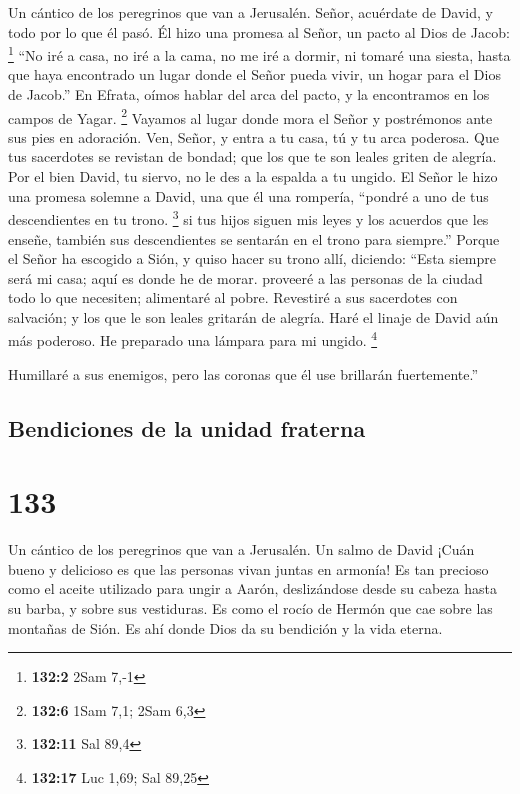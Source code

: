 Un cántico de los peregrinos que van a Jerusalén.  Señor,
acuérdate de David, y todo por lo que él pasó.  Él hizo una
promesa al Señor, un pacto al Dios de Jacob: \footnote{\textbf{132:2}
  2Sam 7,-1}  ``No iré a casa, no iré a la cama,
 no me iré a dormir, ni tomaré una siesta, 
hasta que haya encontrado un lugar donde el Señor pueda vivir, un hogar
para el Dios de Jacob.''  En Efrata, oímos hablar del arca
del pacto, y la encontramos en los campos de Yagar. \footnote{\textbf{132:6}
  1Sam 7,1; 2Sam 6,3}  Vayamos al lugar donde mora el Señor
y postrémonos ante sus pies en adoración.  Ven, Señor, y
entra a tu casa, tú y tu arca poderosa.  Que tus sacerdotes
se revistan de bondad; que los que te son leales griten de alegría.
 Por el bien David, tu siervo, no le des a la espalda a tu
ungido.  El Señor le hizo una promesa solemne a David, una
que él una rompería, ``pondré a uno de tus descendientes en tu trono.
\footnote{\textbf{132:11} Sal 89,4}  si tus hijos siguen
mis leyes y los acuerdos que les enseñe, también sus descendientes se
sentarán en el trono para siempre.''  Porque el Señor ha
escogido a Sión, y quiso hacer su trono allí, diciendo: 
``Esta siempre será mi casa; aquí es donde he de morar. 
proveeré a las personas de la ciudad todo lo que necesiten; alimentaré
al pobre.  Revestiré a sus sacerdotes con salvación; y los
que le son leales gritarán de alegría.  Haré el linaje de
David aún más poderoso. He preparado una lámpara para mi ungido.
\footnote{\textbf{132:17} Luc 1,69; Sal 89,25}

 Humillaré a sus enemigos, pero las coronas que él use
brillarán fuertemente.''

\hypertarget{bendiciones-de-la-unidad-fraterna}{%
\subsection{Bendiciones de la unidad
fraterna}\label{bendiciones-de-la-unidad-fraterna}}

\hypertarget{section-132}{%
\section{133}\label{section-132}}

Un cántico de los peregrinos que van a Jerusalén. Un salmo de David
 ¡Cuán bueno y delicioso es que las personas vivan juntas en
armonía!  Es tan precioso como el aceite utilizado para
ungir a Aarón, deslizándose desde su cabeza hasta su barba, y sobre sus
vestiduras.  Es como el rocío de Hermón que cae sobre las
montañas de Sión. Es ahí donde Dios da su bendición y la vida eterna.

